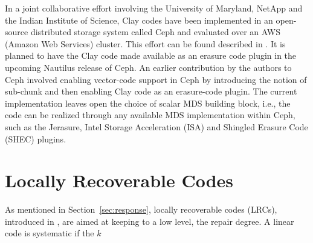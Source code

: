 \begin{multicols}{2}
\vskip -3pt

 In  a joint collaborative effort involving the University of Maryland, NetApp and the Indian Institute of Science, Clay codes have been implemented in an open-source distributed storage system called Ceph \cite{ceph} and evaluated over an AWS (Amazon Web Services) cluster. This effort can be found described in \cite{VajhaFAST18}.  It is planned to have the Clay code made available as an erasure code plugin in the upcoming Nautilus release \cite{nautilusceph2} of Ceph.  An earlier contribution by the authors to Ceph involved enabling vector-code support in Ceph by introducing the notion of sub-chunk and then enabling Clay code as an erasure-code plugin. The current implementation leaves open the choice of scalar MDS building block, i.e., the code can be realized through any available MDS implementation within Ceph, such as the Jerasure, Intel Storage Acceleration (ISA) and Shingled Erasure Code (SHEC) plugins.\\[-20pt]

\section{Locally Recoverable Codes} 

\vskip -3pt

{\parfillskip=0pt
As mentioned in Section~\ref{sec:response}, locally recoverable codes (LRCs), introduced in \cite{GopHuaSimYek}, are aimed at keeping to a low level, the repair degree.   A linear code is systematic if the $k$\par}
\end{multicols}

